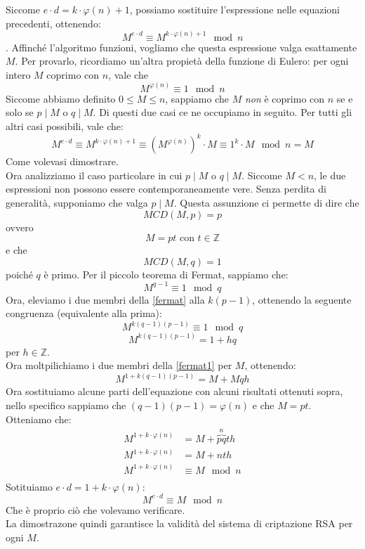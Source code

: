 \documentclass[italian,A4,12pt]{article}
\begin{document}
      Siccome $e\cdot d=k\cdot \varphi(n)+1$, possiamo sostituire l'espressione nelle equazioni precedenti, ottenendo:
      $$M^{e\cdot d}\equiv M^{k\cdot \varphi(n)+1} \mod{n}$$.
      Affinché l'algoritmo funzioni, vogliamo che questa espressione valga esattamente $M$. Per provarlo, ricordiamo un'altra propietà della funzione di Eulero: per ogni intero $M$ coprimo con $n$, vale che
      $$M^{\varphi(n)}\equiv 1 \mod{n}$$
      Siccome abbiamo definito $0\leq M \leq n$, sappiamo che $M$ \textit{non} è coprimo con $n$ se e solo se $p\mid M$ o $q\mid M$. Di questi due casi ce ne occupiamo in seguito.
      Per tutti gli altri casi possibili, vale che:
      $$M^{e\cdot d}\equiv M^{k\cdot \varphi(n)+1}\equiv \left(M^{\varphi(n)}\right)^k\cdot M \equiv 1^k\cdot M \mod{n}=M$$
      Come volevasi dimostrare.\\
      Ora analizziamo il caso particolare in cui $p\mid M$ o $q\mid M$. Siccome $M<n$, le due espressioni non possono essere contemporaneamente vere. Senza perdita di generalità, supponiamo che valga $p\mid M$.
      Questa assunzione ci permette di dire che
      $$MCD(M,p)=p$$
      ovvero
      $$M=pt\text{ con }t\in\mathbb{Z}$$
      e che
      $$MCD(M,q)=1$$
      poiché $q$ è primo.
      Per il piccolo teorema di Fermat, sappiamo che:
      \begin{equation}
        M^{q-1}\equiv 1 \mod{q} \label{fermat}
      \end{equation}
      Ora, eleviamo i due membri della \eqref{fermat} alla $k(p-1)$, ottenendo la seguente congruenza (equivalente alla prima):
      $$M^{k(q-1)(p-1)}\equiv 1 \mod{q}$$
      \begin{equation}
          M^{k(q-1)(p-1)}=1+hq \label{fermat1}
      \end{equation}
      per $h\in\mathbb{Z}$.\\
      Ora moltpilichiamo i due membri della \eqref{fermat1} per $M$, ottenendo:
      $$M^{1+k(q-1)(p-1)}=M+Mqh$$
      Ora sostituiamo alcune parti dell'equazione con alcuni risultati ottenuti sopra, nello specifico sappiamo che $(q-1)(p-1)=\varphi(n)$ e che $M=pt$. Otteniamo che:
      \begin{align*}
        M^{1+k\cdot \varphi(n)}&=M+\overbrace{pq}^{n}th\\
        M^{1+k\cdot \varphi(n)}&=M+nth\\
        M^{1+k\cdot \varphi(n)}&\equiv M \mod{n}\\
      \end{align*}
      Sotituiamo $e\cdot d=1+k\cdot \varphi(n)$:
      $$M^{e\cdot d}\equiv M \mod{n}$$
      Che è proprio ciò che volevamo verificare.\\
      La dimostrazone quindi garantisce la validità del sistema di criptazione RSA per ogni $M$.
\end{document}
